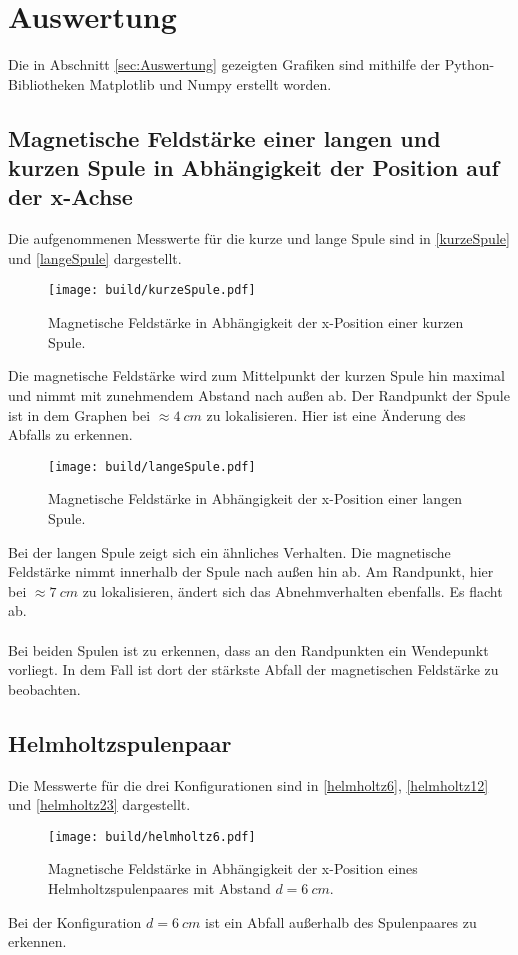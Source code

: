 \section{Auswertung}
\label{sec:Auswertung}
Die in Abschnitt \autoref{sec:Auswertung} gezeigten Grafiken sind mithilfe der Python-Bibliotheken Matplotlib \cite{matplotlib} und Numpy \cite{numpy}
erstellt worden.
\subsection{Magnetische Feldstärke einer langen und kurzen Spule in Abhängigkeit der Position auf der x-Achse}

Die aufgenommenen Messwerte für die kurze und lange Spule sind in \autoref{kurzeSpule} und \autoref{langeSpule} dargestellt.
\begin{figure}[H]
    \texttt{[image: build/kurzeSpule.pdf]}
    \caption{Magnetische Feldstärke in Abhängigkeit der x-Position einer kurzen Spule.}
    \label{kurzeSpule}
\end{figure}
Die magnetische Feldstärke wird zum Mittelpunkt der kurzen Spule hin maximal und nimmt mit zunehmendem Abstand nach außen ab. 
Der Randpunkt der Spule ist in dem Graphen bei $\approx \SI{4}{cm}$ zu lokalisieren. Hier ist eine Änderung des Abfalls zu erkennen.

\begin{figure}[H]
    \texttt{[image: build/langeSpule.pdf]}
    \caption{Magnetische Feldstärke in Abhängigkeit der x-Position einer langen Spule.}
    \label{langeSpule}
\end{figure}
Bei der langen Spule zeigt sich ein ähnliches Verhalten. Die magnetische Feldstärke nimmt innerhalb der Spule nach außen hin ab. Am Randpunkt, hier bei 
$\approx \SI{7}{cm}$ zu lokalisieren, ändert sich das Abnehmverhalten ebenfalls. Es flacht ab. 
\\
\\
Bei beiden Spulen ist zu erkennen, dass an den Randpunkten ein Wendepunkt vorliegt. In dem Fall ist dort der stärkste Abfall der magnetischen
Feldstärke zu beobachten.
\newpage
\subsection{Helmholtzspulenpaar}
Die Messwerte für die drei Konfigurationen sind in \autoref{helmholtz6}, \autoref{helmholtz12} und \autoref{helmholtz23} dargestellt.

\begin{figure}[H]
    \texttt{[image: build/helmholtz6.pdf]}
    \caption{Magnetische Feldstärke in Abhängigkeit der x-Position eines Helmholtzspulenpaares mit Abstand $d =\SI{6}{cm}$.}
    \label{helmholtz6}
\end{figure}
Bei der Konfiguration $d = \SI{6}{cm}$ ist ein Abfall außerhalb des Spulenpaares zu erkennen.

